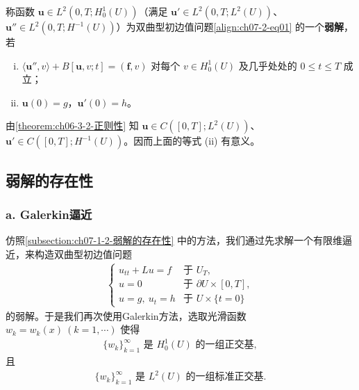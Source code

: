 \documentclass[../../main.tex]{subfiles}
\begin{document}
\begin{definition}\label{definition:ch07-2-双曲弱解}
称函数 $\mathbf{u}\in L^2(0,T;H^1_0(U))$（满足 $\mathbf{u}'\in L^2(0,T;L^2(U))$、$\mathbf{u}''\in L^2(0,T;H^{-1}(U))$）为双曲型初边值问题\eqref{align:ch07-2-eq01} 的一个\textbf{弱解}，若
\begin{enumerate}[(i)]
\item $\langle\mathbf{u}'',v\rangle+B[\mathbf{u},v;t]=(\mathbf{f},v)$ 对每个 $v\in H^1_0(U)$ 及几乎处处的 $0\leqslant t\leqslant T$ 成立；
\item $\mathbf{u}(0)=g$，$\mathbf{u}'(0)=h$。
\end{enumerate}
\end{definition}

\begin{remark}\label{remark:ch07-2-弱解初值合理}
由\cref{theorem:ch06-3-2-正则性} 知 $\mathbf{u}\in C([0,T];L^2(U))$、$\mathbf{u}'\in C([0,T];H^{-1}(U))$。因而上面的等式 (ii) 有意义。
\end{remark}

\subsection{弱解的存在性}\label{subsection:ch07-2-2-弱解的存在性}

\subsubsection*{a. Galerkin逼近}

仿照\cref{subsection:ch07-1-2-弱解的存在性} 中的方法，我们通过先求解一个有限维逼近，来构造双曲型初边值问题
\begin{align}
\begin{cases}
u_{tt}+Lu=f & \text{于 } U_T,\\
u=0 & \text{于 } \partial U\times[0,T],\\
u=g,\ u_t=h & \text{于 } U\times\{t=0\}
\end{cases}\label{align:ch07-2-eq10}
\end{align}
的弱解。于是我们再次使用Galerkin方法，选取光滑函数 $w_k=w_k(x)\ (k=1,\cdots)$ 使得
\begin{align}
\{w_k\}_{k=1}^\infty \text{ 是 } H^1_0(U) \text{ 的一组正交基},\label{align:ch07-2-eq11}
\end{align}
且
\begin{align}
\{w_k\}_{k=1}^\infty \text{ 是 } L^2(U) \text{ 的一组标准正交基}.\label{align:ch07-2-eq12}
\end{align}
\end{document}
